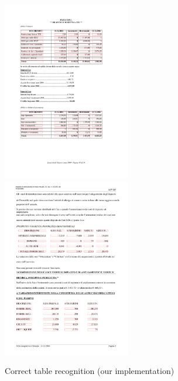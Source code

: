 \begin{figure}[t]
\centering
\includegraphics[width=15em]{img/results/goodRes1.png}
\includegraphics[width=15em]{img/results/goodRes2.png}
\caption{Correct table recognition (our implementation)}
\label{fig:sampleResults}
\end{figure}